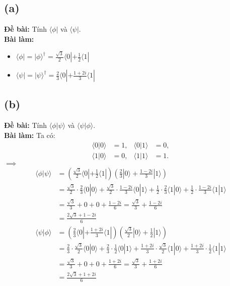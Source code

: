 \subsection{(a)}
\textbf{Đề bài:} Tính $\langle\phi|$ và $\langle\psi|$.\\
\textbf{Bài làm:}
\begin{itemize}
    \item $\langle\phi| = |\phi\rangle^\dagger = \frac{\sqrt{3}}{2}\langle0|+\frac{1}{2}\langle1|$
    \item $\langle\psi| = |\psi\rangle^\dagger = \frac{2}{3}\langle0|+\frac{1+2i}{3}\langle1|$
\end{itemize}

\subsection{(b)}
\textbf{Đề bài:} Tính $\langle\phi|\psi\rangle$ và $\langle\psi|\phi\rangle$.\\
\textbf{Bài làm:}
Ta có:
\begin{align*}
    \langle0|0\rangle &= 1, & \langle0|1\rangle &= 0,\\
    \langle1|0\rangle &= 0, & \langle1|1\rangle &= 1.
\end{align*}
$\implies$
\begin{align*}
    \langle\phi|\psi\rangle &= \left(\frac{\sqrt{3}}{2}\langle0|+\frac{1}{2}\langle1|\right)\left(\frac{2}{3}|0\rangle+\frac{1-2i}{3}|1\rangle\right)\\
    &= \frac{\sqrt{3}}{2}\cdot\frac{2}{3}\langle0|0\rangle + \frac{\sqrt{3}}{2}\cdot\frac{1-2i}{3}\langle0|1\rangle + \frac{1}{2}\cdot\frac{2}{3}\langle1|0\rangle + \frac{1}{2}\cdot\frac{1-2i}{3}\langle1|1\rangle\\
    &= \frac{\sqrt{3}}{3} + 0 + 0 + \frac{1-2i}{6} = \frac{\sqrt{3}}{3} + \frac{1-2i}{6}\\
    &= \frac{2\sqrt{3} + 1 - 2i}{6}
\end{align*}
\begin{align*}
    \langle\psi|\phi\rangle &= \left(\frac{2}{3}\langle0|+\frac{1+2i}{3}\langle1|\right)\left(\frac{\sqrt{3}}{2}|0\rangle+\frac{1}{2}|1\rangle\right)\\
    &= \frac{2}{3}\cdot\frac{\sqrt{3}}{2}\langle0|0\rangle + \frac{2}{3}\cdot\frac{1}{2}\langle0|1\rangle + \frac{1+2i}{3}\cdot\frac{\sqrt{3}}{2}\langle1|0\rangle + \frac{1+2i}{3}\cdot\frac{1}{2}\langle1|1\rangle\\
    &= \frac{\sqrt{3}}{3} + 0 + 0 + \frac{1+2i}{6} = \frac{\sqrt{3}}{3} + \frac{1+2i}{6}\\
    &= \frac{2\sqrt{3} + 1 + 2i}{6}
\end{align*}

